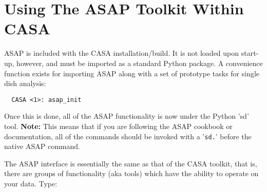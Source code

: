 

\section{Using The ASAP Toolkit Within CASA}
\label{section:sd.asap}

ASAP is included with the CASA installation/build. It is not loaded
upon start-up, however, and must be imported as a standard Python
package. A convenience function exists for importing ASAP along with
a set of prototype tasks for single dish analysis:
\small
\begin{verbatim}
  CASA <1>: asap_init
\end{verbatim}
\normalsize
Once this is done, all of the ASAP functionality is now under the
Python 'sd' tool.  {\bf Note:} This means that if you are following
the ASAP cookbook or documentation, all of the commands should be 
invoked with a '{\tt sd.}' before the native ASAP command.

The ASAP interface is essentially the same as that
of the CASA toolkit, that is, there are groups of functionality (aka
tools) which have the ability to operate on your data. Type:

